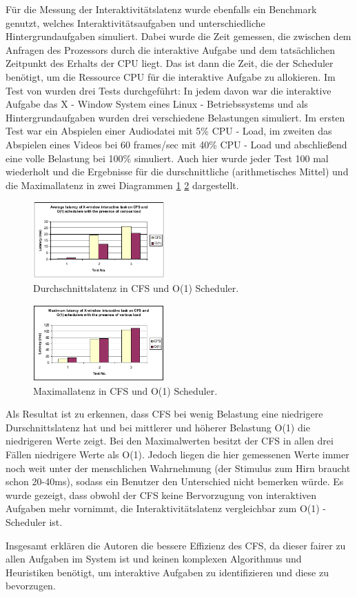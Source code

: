Für die Messung der Interaktivitätslatenz wurde ebenfalls ein Benchmark genutzt, welches Interaktivitätsaufgaben und unterschiedliche Hintergrundaufgaben simuliert. Dabei wurde die Zeit gemessen, die zwischen dem Anfragen des Prozessors durch die interaktive Aufgabe und dem tatsächlichen Zeitpunkt des Erhalts der CPU liegt. Das ist dann die Zeit, die der Scheduler benötigt, um die Ressource CPU für die interaktive Aufgabe zu allokieren. Im Test von \cite{papercomparison} wurden drei Tests durchgeführt: In jedem davon war die interaktive Aufgabe das X - Window System eines Linux - Betriebssystems und als Hintergrundaufgaben wurden drei verschiedene Belastungen simuliert. Im ersten Test war ein Abspielen einer Audiodatei mit 5\% CPU - Load, im zweiten das Abspielen eines Videos bei 60 frames/sec mit 40\% CPU - Load und abschließend eine volle Belastung bei 100\% simuliert. Auch hier wurde jeder Test 100 mal wiederholt und die Ergebnisse für die durschnittliche (arithmetisches Mittel) und die Maximallatenz in zwei Diagrammen \ref{fig:avg_latency} \ref{fig:max_latency} dargestellt. 
\begin{figure} [h]
 	\centering
 	\includegraphics[width=0.45\textwidth]{pictures/avg_latency.png}
 	\caption{Durchschnittslatenz in CFS und O(1) Scheduler.}
 	\label{fig:avg_latency}
\end{figure}

\begin{figure} [h]
 	\centering
 	\includegraphics[width=0.45\textwidth]{pictures/max_latency.png}
 	\caption{Maximallatenz in CFS und O(1) Scheduler.}
 	\label{fig:max_latency}
\end{figure}
Als Resultat ist zu erkennen, dass CFS bei wenig Belastung eine niedrigere Durschnittslatenz hat und bei mittlerer und höherer Belastung O(1) die niedrigeren Werte zeigt. Bei den Maximalwerten besitzt der CFS in allen drei Fällen niedrigere Werte als O(1). Jedoch liegen die hier gemessenen Werte immer noch weit unter der menschlichen Wahrnehmung (der Stimulus zum Hirn braucht schon 20-40ms), sodass ein Benutzer den Unterschied nicht bemerken würde. Es wurde gezeigt, dass obwohl der CFS keine Bervorzugung von interaktiven Aufgaben mehr vornimmt, die Interaktivitätslatenz vergleichbar zum O(1) - Scheduler ist. 

Insgesamt erklären die Autoren die bessere Effizienz des CFS, da dieser fairer zu allen Aufgaben im System ist und keinen komplexen Algorithmus und Heuristiken benötigt, um interaktive Aufgaben zu identifizieren und diese zu bevorzugen.